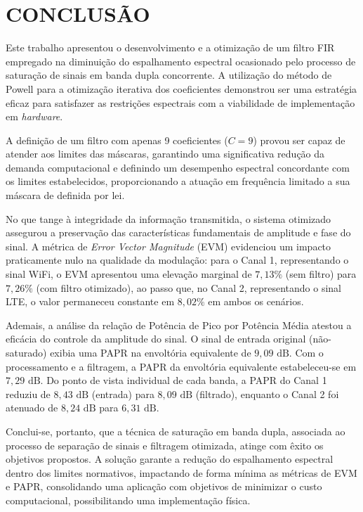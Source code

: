 \chapter{CONCLUSÃO}

Este trabalho apresentou o desenvolvimento e a otimização de um filtro FIR empregado na diminuição do espalhamento espectral ocasionado pelo processo de saturação de sinais em banda dupla concorrente. A utilização do método de Powell para a otimização iterativa dos coeficientes demonstrou ser uma estratégia  eficaz para satisfazer as restrições espectrais com a viabilidade de implementação em \textit{hardware}.

A definição de um filtro com apenas 9 coeficientes ($C = 9$) provou ser capaz de atender aos limites das máscaras, garantindo uma significativa redução da demanda computacional e definindo um desempenho espectral concordante com os limites estabelecidos, proporcionando a atuação em frequência limitado a sua máscara de definida por lei.

No que tange à integridade da informação transmitida, o sistema otimizado assegurou a preservação das características fundamentais de amplitude e fase do sinal. A métrica de \textit{Error Vector Magnitude} (EVM) evidenciou um impacto praticamente nulo na qualidade da modulação: para o Canal 1, representando o sinal WiFi, o EVM apresentou uma elevação marginal de $7,13\%$ (sem filtro) para $7,26\%$ (com filtro otimizado), ao passo que, no Canal 2, representando o sinal LTE, o valor permaneceu constante em $8,02\%$ em ambos os cenários.

Ademais, a análise da relação de Potência de Pico por Potência Média atestou a eficácia do controle da amplitude do sinal. O sinal de entrada original (não-saturado) exibia uma PAPR na envoltória equivalente de $9,09\text{ dB}$. Com o processamento e a filtragem, a PAPR da envoltória equivalente estabeleceu-se em $7,29\text{ dB}$. Do ponto de vista individual de cada banda, a PAPR do Canal 1 reduziu de $8,43\text{ dB}$ (entrada) para $8,09\text{ dB}$ (filtrado), enquanto o Canal 2 foi atenuado de $8,24\text{ dB}$ para $6,31\text{ dB}$.

Conclui-se, portanto, que a técnica de saturação em banda dupla, associada ao processo de separação de sinais e filtragem otimizada, atinge com êxito os objetivos propostos. A solução garante a redução do espalhamento espectral dentro dos limites normativos, impactando de forma mínima as métricas de EVM e PAPR, consolidando uma aplicação com objetivos de minimizar o custo computacional, possibilitando uma implementação física.
